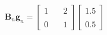 \documentclass[preview]{standalone}
\begin{document}
\begin{align*}
\mathbf{B}_n \mathbf{g}_n = \begin{bmatrix} 1 & \quad 2 \\ \\0 & \quad 1 \end{bmatrix}\begin{bmatrix} 1.5 \\ \\ 0.5 \end{bmatrix}
\end{align*}
\end{document}
